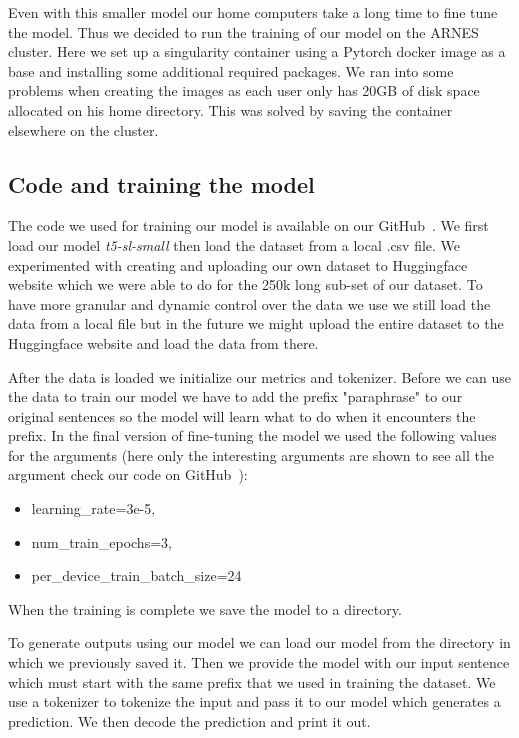 \documentclass[fleqn,moreauthors,10pt]{ds_report}
\begin{document}
Even with this smaller model our home computers take a long time to fine tune the model. Thus we decided to run the training of our model on the ARNES cluster. Here we set up a singularity container using a Pytorch docker image as a base and installing some additional required packages. We ran into some problems when creating the images as each user only has 20GB of disk space allocated on his home directory. This was solved by saving the container elsewhere on the cluster. 

\subsection{Code and training the model}
The code we used for training our model is available on our GitHub~\cite{GitHub}. We first load our model \emph{t5-sl-small} then load the dataset from a local .csv file. We experimented with creating and uploading our own dataset to Huggingface website which we were able to do for the 250k long sub-set of our dataset. To have more granular and dynamic control over the data we use we still load the data from a local file but in the future we might upload the entire dataset to the Huggingface website and load the data from there.

After the data is loaded we initialize our metrics and tokenizer. Before we can use the data to train our model we have to add the prefix "paraphrase" to our original sentences so the model will learn what to do when it encounters the prefix. In the final version of fine-tuning the model we used the following values for the arguments (here only the interesting arguments are shown to see all the argument check our code on GitHub~\cite{GitHub}): 

\begin{itemize}[itemsep=2pt]
    \item learning\_rate=3e-5,
    \item num\_train\_epochs=3,
    \item per\_device\_train\_batch\_size=24
\end{itemize}

When the training is complete we save the model to a directory. 

To generate outputs using our model we can load our model from the directory in which we previously saved it. Then we provide the model with our input sentence which must start with the same prefix that we used in training the dataset. We use a tokenizer to tokenize the input and pass it to our model which generates a prediction. We then decode the prediction and print it out. 
\end{document}
